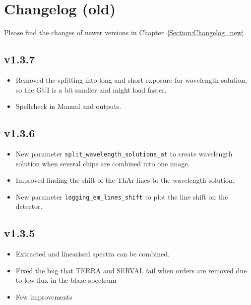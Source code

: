 \documentclass[10pt,a4paper]{article}
\begin{document}


\newpage

\appendix

\section{Changelog (old)}
\label{Section:Changelog_old}
Please find the changes of newer versions in Chapter~\ref{Section:Changelog_new}.

\subsection*{v1.3.7}
\begin{itemize}\setlength\itemsep{0em}
  \item Removed the splitting into long and short exposure for wavelength solution, so the GUI is a bit smaller and might load faster.
  \item Spellcheck in Manual and outputs.
\end{itemize}

\subsection*{v1.3.6}
\begin{itemize}\setlength\itemsep{0em}
  \item New parameter \verb|split_wavelength_solutions_at| to create wavelength solution when several chips are combined into one image.
  \item Improved finding the shift of the ThAr lines to the wavelength solution.
  \item New parameter \verb|logging_em_lines_shift| to plot the line shift on the detector.
\end{itemize}

\subsection*{v1.3.5}
\begin{itemize}\setlength\itemsep{0em}
  \item Extracted and linearised spectra can be combined.
  \item Fixed the bug that TERRA and SERVAL fail when orders are removed due to low flux in the blaze spectrum
  \item Few improvements
\end{itemize}
\end{document}
